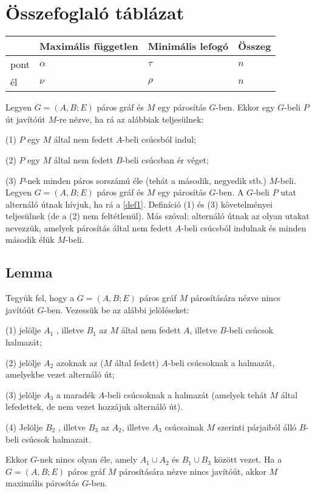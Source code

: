 \documentclass[12pt,a4paper,twoside]{report}
\begin{document}
\section{Összefoglaló táblázat}
\begin{table}[th]
	\begin{tabular}{|l|l|l|l|}
		\hline
		& Maximális független & Minimális lefogó & Összeg \\ \hline
		pont & $\alpha$      & $\tau$           & $n$      \\ \hline
		él   & $\nu$         & $\rho$           & $n$      \\ \hline
	\end{tabular}
\end{table}
\df 
Legyen $G = (A, B; E)$ páros gráf és $M$ egy párosítás $G$-ben. Ekkor
egy $G$-beli $P$ út javítóút $M$-re nézve, ha rá az alábbiak teljesülnek:

(1) $P$ egy $M$ által nem fedett $A$-beli csúcsból indul;

(2) $P$ egy $M$ által nem fedett $B$-beli csúcsban ér véget;

(3) $P$-nek minden páros sorszámú éle (tehát a második, negyedik stb.) $M$-beli.
\df\label{def1} 
Legyen $G = (A, B; E)$ páros gráf és $M$ egy párosítás $G$-ben. A
$G$-beli $P$ utat alternáló útnak hívjuk, ha rá a  \ref{def1}. Definíció (1) és (3) követelményei teljesülnek (de a (2) nem feltétlenül). Más szóval: alternáló útnak az olyan utakat nevezzük, amelyek párosítás által nem fedett $A$-beli csúcsból indulnak és minden második élük $M$-beli.
\subsection{Lemma}
Tegyük fel, hogy a $G = (A, B; E)$ páros gráf $M$ párosítására nézve nincs javítóút $G$-ben. Vezessük be az alábbi jelöléseket:

(1) jelölje $A_1$ , illetve $B_1$ az $M$ által nem fedett $A$, illetve $B$-beli csúcsok halmazát;

(2) jelölje $A_2$ azoknak az ($M$ által fedett) $A$-beli csúcsoknak a halmazát, amelyekbe vezet alternáló út;

(3) jelölje $A_3$ a maradék $A$-beli csúcsoknak a halmazát (amelyek tehát $M$ által
lefedettek, de nem vezet hozzájuk alternáló út).

(4) Jelölje $B_2$ , illetve $B_3$ az $A_2$, illetve $A_3$ csúcsainak $M$ szerinti párjaiból álló $B$-beli csúcsok halmazait.

Ekkor $G$-nek nincs olyan éle, amely $A_1 \cup A_2$ és $B_1 \cup B_3$ között vezet.
\ttl
Ha a $G = (A, B; E)$ páros gráf $M$ párosítására nézve nincs javítóút,
akkor $M$ maximális párosítás $G$-ben.
\end{document}

